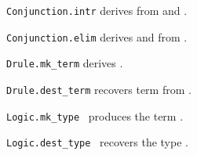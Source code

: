 \begin{isabellebody}
\begin{isamarkuptext}
  \begin{description}

  \item \verb|Conjunction.intr| derives  from  and .

  \item \verb|Conjunction.elim| derives  and 
  from .

  \item \verb|Drule.mk_term| derives .

  \item \verb|Drule.dest_term| recovers term  from .

  \item \verb|Logic.mk_type|~ produces the term .

  \item \verb|Logic.dest_type|~ recovers the type
  .


\end{description}
\end{isamarkuptext}
\end{isabellebody}
